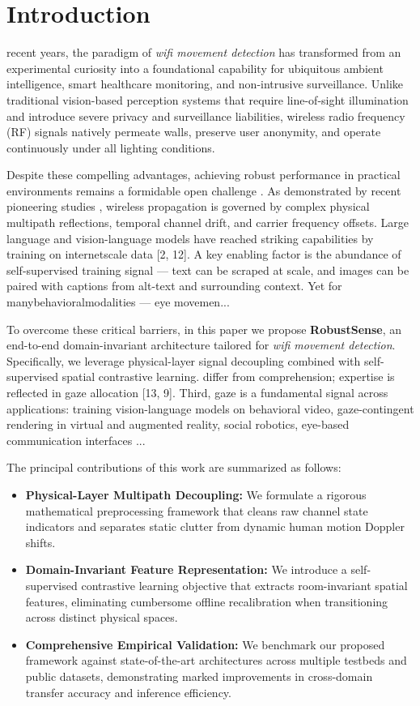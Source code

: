 \section{Introduction}
\label{sec:intro}
 recent years, the paradigm of \textit{wifi movement detection} has transformed from an experimental curiosity into a foundational capability for ubiquitous ambient intelligence, smart healthcare monitoring, and non-intrusive surveillance. Unlike traditional vision-based perception systems that require line-of-sight illumination and introduce severe privacy and surveillance liabilities, wireless radio frequency (RF) signals natively permeate walls, preserve user anonymity, and operate continuously under all lighting conditions.

Despite these compelling advantages, achieving robust performance in practical environments remains a formidable open challenge \cite{2604.05475v1}. As demonstrated by recent pioneering studies \cite{1004.4588v1}, wireless propagation is governed by complex physical multipath reflections, temporal channel drift, and carrier frequency offsets. Large language and vision-language models have reached striking capabilities by training on internetscale data [2, 12]. A key enabling factor is the abundance of self-supervised training signal — text can be scraped at scale, and images can be paired with captions from alt-text and surrounding context. Yet for manybehavioralmodalities — eye movemen...

To overcome these critical barriers, in this paper we propose \textbf{RobustSense}, an end-to-end domain-invariant architecture tailored for \textit{wifi movement detection}. Specifically, we leverage physical-layer signal decoupling combined with self-supervised spatial contrastive learning. differ from comprehension; expertise is reflected in gaze allocation [13, 9]. Third, gaze is a fundamental signal across applications: training vision-language models on behavioral video, gaze-contingent rendering in virtual and augmented reality, social robotics, eye-based communication interfaces ...

The principal contributions of this work are summarized as follows:
\begin{itemize}
    \item \textbf{Physical-Layer Multipath Decoupling:} We formulate a rigorous mathematical preprocessing framework that cleans raw channel state indicators and separates static clutter from dynamic human motion Doppler shifts.
    \item \textbf{Domain-Invariant Feature Representation:} We introduce a self-supervised contrastive learning objective that extracts room-invariant spatial features, eliminating cumbersome offline recalibration when transitioning across distinct physical spaces.
    \item \textbf{Comprehensive Empirical Validation:} We benchmark our proposed framework against state-of-the-art architectures across multiple testbeds and public datasets, demonstrating marked improvements in cross-domain transfer accuracy and inference efficiency.
\end{itemize}

